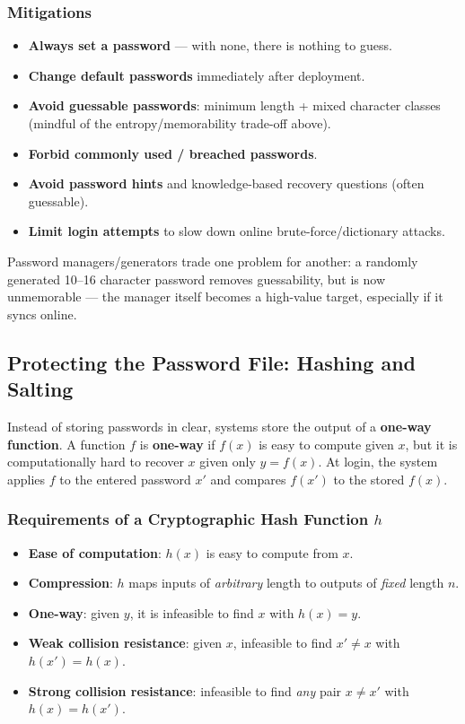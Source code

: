 \documentclass[12pt, a4paper]{article}
\begin{document}
\subsubsection{Mitigations}
\begin{itemize}
    \item \textbf{Always set a password} — with none, there is nothing to guess.
    \item \textbf{Change default passwords} immediately after deployment.
    \item \textbf{Avoid guessable passwords}: minimum length + mixed character classes (mindful of the entropy/memorability trade-off above).
    \item \textbf{Forbid commonly used / breached passwords}.
    \item \textbf{Avoid password hints} and knowledge-based recovery questions (often guessable).
    \item \textbf{Limit login attempts} to slow down online brute-force/dictionary attacks.
\end{itemize}

Password managers/generators trade one problem for another: a randomly generated 10--16 character password removes guessability, but is now unmemorable — the manager itself becomes a high-value target, especially if it syncs online.

\subsection{Protecting the Password File: Hashing and Salting}
\label{subsec:hashing-salting-03}

Instead of storing passwords in clear, systems store the output of a \textbf{one-way function}. A function $f$ is \textbf{one-way} if $f(x)$ is easy to compute given $x$, but it is computationally hard to recover $x$ given only $y=f(x)$. At login, the system applies $f$ to the entered password $x'$ and compares $f(x')$ to the stored $f(x)$.

\subsubsection{Requirements of a Cryptographic Hash Function \texorpdfstring{$h$}{h}}
\begin{itemize}
    \item \textbf{Ease of computation}: $h(x)$ is easy to compute from $x$.
    \item \textbf{Compression}: $h$ maps inputs of \emph{arbitrary} length to outputs of \emph{fixed} length $n$.
    \item \textbf{One-way}: given $y$, it is infeasible to find $x$ with $h(x) = y$.
    \item \textbf{Weak collision resistance}: given $x$, infeasible to find $x' \neq x$ with $h(x') = h(x)$.
    \item \textbf{Strong collision resistance}: infeasible to find \emph{any} pair $x \neq x'$ with $h(x) = h(x')$.
\end{itemize}
\end{document}
